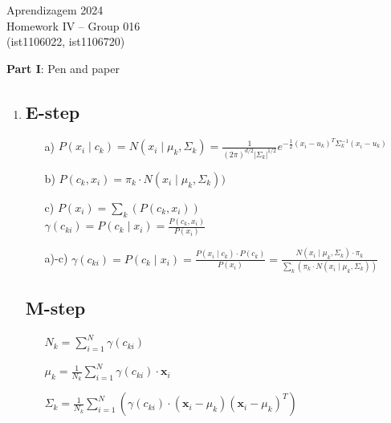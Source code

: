 \documentclass[12pt]{article}
\begin{document}
\center
Aprendizagem 2024\\
Homework IV -- Group 016\\
(ist1106022, ist1106720)\vskip 1cm

\large{\textbf{Part I}: Pen and paper}\normalsize
\begin{enumerate}[leftmargin=0pt, label=\textbf{\arabic*.)}]
    \item
          \subsection*{E-step}
          \begin{enumerate}
              \item[a)]
                    $P(x_i \mid c_k) = N(x_i \mid \mu_k, \Sigma_k) = \frac{1}{(2\pi)^{d/2} |\Sigma_k|^{1/2}} e^{-\frac{1}{2} (x_i - u_k)^T \Sigma_k^{-1} (x_i - u_k)}$

              \item[b)]
                    $P(c_k, x_i) = \pi_k \cdot N(x_i \mid \mu_k, \Sigma_k))$

              \item[c)]
                    $P(x_i) = \sum_k (P(c_k, x_i))$ \\
                    $\gamma(c_{ki}) = P(c_k \mid x_i) = \frac{P(c_k , x_i)}{P(x_i)}$

              \item[a)-c)]
                    $\gamma(c_{ki}) = P(c_k \mid x_i) = \frac{P(x_i \mid c_k) \cdot P(c_k)}{P(x_i)} = \frac{N(x_i \mid \mu_k, \Sigma_k) \cdot \pi_k}{\sum_k (\pi_k \cdot N(x_i \mid \mu_k, \Sigma_k))}$
          \end{enumerate}

          \subsection*{M-step}
          \begin{enumerate}
              \item[]
                    $N_k = \sum_{i=1}^{N} \gamma(c_{ki})$

              \item[]
                    $\mu_k = \frac{1}{N_k} \sum_{i=1}^{N} \gamma(c_{ki}) \cdot \mathbf{x}_i$

              \item[]
                    $\Sigma_k = \frac{1}{N_k} \sum_{i=1}^{N} \left( \gamma(c_{ki}) \cdot (\mathbf{x}_i - \mu_k)(\mathbf{x}_i - \mu_k)^T \right)$


\end{enumerate}
\end{enumerate}
\end{document}
